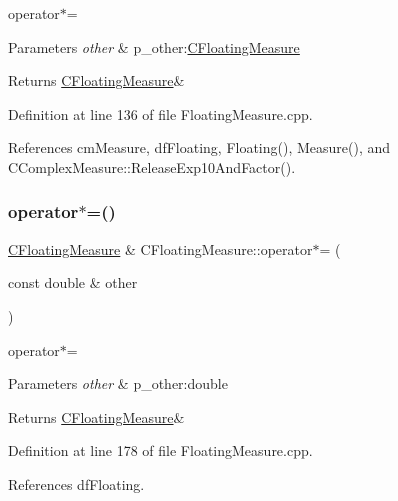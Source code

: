 operator$\ast$= 


\begin{DoxyParams}{Parameters}
{\em other} & p\+\_\+other\+:\hyperlink{classCFloatingMeasure}{C\+Floating\+Measure} \\
\hline
\end{DoxyParams}
\begin{DoxyReturn}{Returns}
\hyperlink{classCFloatingMeasure}{C\+Floating\+Measure}\& 
\end{DoxyReturn}


Definition at line 136 of file Floating\+Measure.\+cpp.



References cm\+Measure, df\+Floating, Floating(), Measure(), and C\+Complex\+Measure\+::\+Release\+Exp10\+And\+Factor().

\mbox{\label{classCFloatingMeasure_a051879dde322060eb7695667dd38ab13}} 
\subsubsection{\texorpdfstring{operator$\ast$=()}{operator*=()}\hspace{0.1cm}{\footnotesize\ttfamily [2/2]}}
{\footnotesize\ttfamily \hyperlink{classCFloatingMeasure}{C\+Floating\+Measure} \& C\+Floating\+Measure\+::operator$\ast$= (\begin{DoxyParamCaption}\item[{const double \&}]{other }\end{DoxyParamCaption})}



operator$\ast$= 


\begin{DoxyParams}{Parameters}
{\em other} & p\+\_\+other\+:double \\
\hline
\end{DoxyParams}
\begin{DoxyReturn}{Returns}
\hyperlink{classCFloatingMeasure}{C\+Floating\+Measure}\& 
\end{DoxyReturn}


Definition at line 178 of file Floating\+Measure.\+cpp.



References df\+Floating.

\mbox{\label{classCFloatingMeasure_a26560fcb587eafe8966541159eec57de}} 
